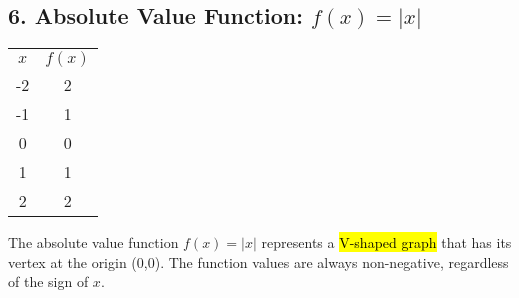 \documentclass[12pt,a4paper]{article}
\begin{document}
\subsection*{6. Absolute Value Function: $f(x) = |x|$}
\begin{minipage}{0.5\textwidth}
\end{minipage}
\hspace{1cm}
\begin{minipage}{0.4\textwidth}
\centering
\begin{tabular}{cc}

$x$ & $f(x)$ \\

-2 & 2 \\
-1 & 1 \\
0 & 0 \\
1 & 1 \\
2 & 2 \\

\end{tabular}
\end{minipage}
\noindent
The absolute value function $f(x) = |x|$ represents a \hl{V-shaped graph} that has its vertex at the origin (0,0). The function values are always non-negative, regardless of the sign of $x$.\\
\end{document}
